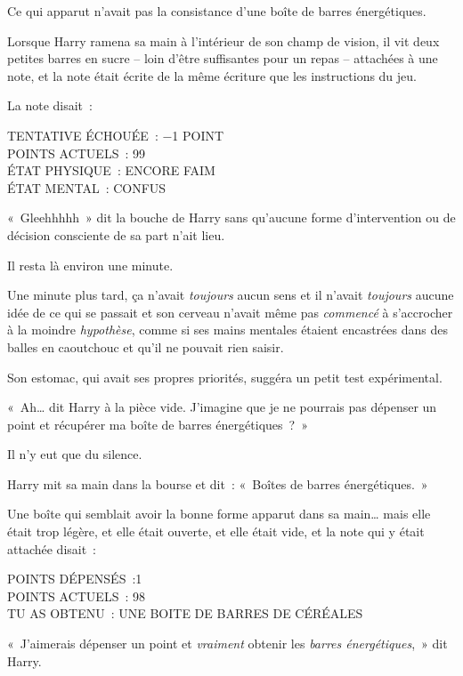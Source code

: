 Ce qui apparut n'avait pas la consistance d'une boîte de barres énergétiques.

Lorsque Harry ramena sa main à l'intérieur de son champ de vision, il vit deux petites barres en sucre -- loin d'être suffisantes pour un repas -- attachées à une note, et la note était écrite de la même écriture que les instructions du jeu.

La note disait~:

\begin{writtenNote}
TENTATIVE ÉCHOUÉE~: −1 POINT\\
POINTS ACTUELS~: 99\\
ÉTAT PHYSIQUE~: ENCORE FAIM\\
ÉTAT MENTAL~: CONFUS
\end{writtenNote}

«~Gleehhhhh~» dit la bouche de Harry sans qu'aucune forme d'intervention ou de décision consciente de sa part n'ait lieu.

Il resta là environ une minute.

Une minute plus tard, ça n'avait \emph{toujours} aucun sens et il n'avait \emph{toujours} aucune idée de ce qui se passait et son cerveau n'avait même pas \emph{commencé} à s'accrocher à la moindre \emph{hypothèse}, comme si ses mains mentales étaient encastrées dans des balles en caoutchouc et qu'il ne pouvait rien saisir.

Son estomac, qui avait ses propres priorités, suggéra un petit test expérimental.

«~Ah… dit Harry à la pièce vide. J'imagine que je ne pourrais pas dépenser un point et récupérer ma boîte de barres énergétiques~?~»

Il n'y eut que du silence.

Harry mit sa main dans la bourse et dit~: «~Boîtes de barres énergétiques.~»

Une boîte qui semblait avoir la bonne forme apparut dans sa main… mais elle était trop légère, et elle était ouverte, et elle était vide, et la note qui y était attachée disait~:

\begin{writtenNote}
POINTS DÉPENSÉS~:1\\
POINTS ACTUELS~: 98\\
TU AS OBTENU~: UNE BOITE DE BARRES DE CÉRÉALES
\end{writtenNote}

«~J'aimerais dépenser un point et \emph{vraiment} obtenir les \emph{barres énergétiques},~» dit Harry.

